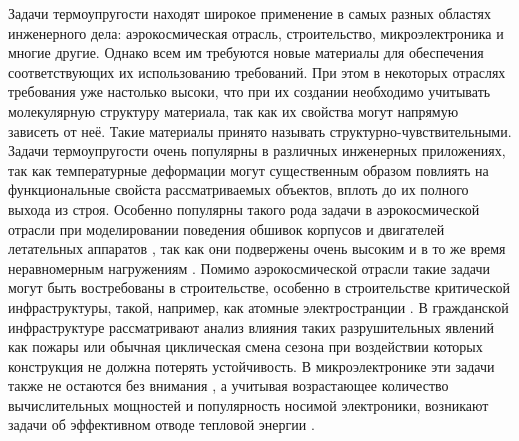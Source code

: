 
{\actuality}
\ifsynopsis
Задачи термоупругости находят широкое применение в самых разных областях инженерного дела: аэрокосмическая отрасль, строительство, микроэлектроника и многие другие. Однако всем им требуются новые материалы для обеспечения соответствующих их использованию требований. При этом в некоторых отраслях требования уже настолько высоки, что при их создании необходимо учитывать молекулярную структуру материала, так как их свойства могут напрямую зависеть от неё. Такие материалы принято называть структурно-чувствительными.
\else
Задачи термоупругости очень популярны в различных инженерных приложениях, так как температурные деформации могут существенным образом повлиять на функциональные свойста рассматриваемых объектов, вплоть до их полного выхода из строя. Особенно популярны такого рода задачи в аэрокосмической отрасли при моделировании поведения обшивок корпусов и двигателей летательных аппаратов \cite{Aerocosmos1, Aerocosmos2, Aerocosmos3}, так как они подвержены очень высоким и в то же время неравномерным нагружениям \cite{Aerocosmos4, Aerocosmos5, Aerocosmos6, Aerocosmos7}. Помимо аэрокосмической отрасли такие задачи могут быть востребованы в строительстве, особенно в строительстве критической инфраструктуры, такой, например, как атомные электространции \cite{StroyMech1, StroyMech2}. В гражданской инфраструктуре рассматривают анализ влияния таких разрушительных явлений как пожары \cite{StroyMech3, StroyMech4} или обычная циклическая смена сезона \cite{StroyMech5, StroyMech6} при воздействии которых конструкция не должна потерять устойчивость. В микроэлектронике эти задачи также не остаются без внимания \cite{MicroElectronic1, MicroElectronic2}, а учитывая возрастающее количество вычислительных мощностей и популярность носимой электроники, возникают задачи об эффективном отводе тепловой энергии \cite{MicroElectronic3}.
\fi

